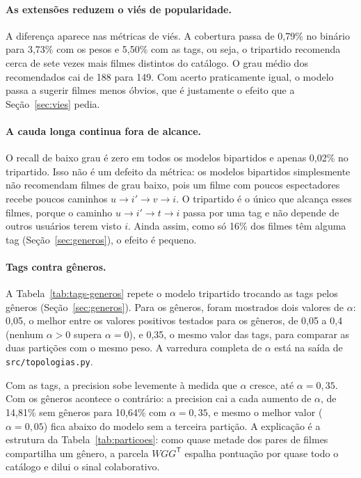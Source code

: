 \documentclass[12pt,a4paper]{article}
\theoremstyle{definition}
\begin{document}
\paragraph{As extensões reduzem o viés de popularidade.}
A diferença aparece nas métricas de viés. A cobertura passa de 0{,}79\%
no binário para 3{,}73\% com os pesos e 5{,}50\% com as tags, ou seja, o
tripartido recomenda cerca de sete vezes mais filmes distintos do
catálogo. O grau médio dos recomendados cai de 188 para 149. Com acerto
praticamente igual, o modelo passa a sugerir filmes menos óbvios, que é
justamente o efeito que a Seção~\ref{sec:vies} pedia.

\paragraph{A cauda longa continua fora de alcance.}
O recall de baixo grau é zero em todos os modelos bipartidos e apenas
0{,}02\% no tripartido. Isso não é um defeito da métrica: os modelos
bipartidos simplesmente não recomendam filmes de grau baixo, pois um
filme com poucos espectadores recebe poucos caminhos
$u \to i' \to v \to i$. O tripartido é o único que alcança esses filmes,
porque o caminho $u \to i' \to t \to i$ passa por uma tag e não depende
de outros usuários terem visto $i$. Ainda assim, como só 16\% dos filmes
têm alguma tag (Seção~\ref{sec:generos}), o efeito é pequeno.

\paragraph{Tags contra gêneros.}
A Tabela~\ref{tab:tags-generos} repete o modelo tripartido trocando as
tags pelos gêneros (Seção~\ref{sec:generos}). Para os gêneros, foram mostrados
dois valores de $\alpha$: 0{,}05, o melhor entre os valores positivos testados para os gêneros, de 0{,}05 a 0{,}4 (nenhum $\alpha > 0$
supera $\alpha = 0$), e 0{,}35, o mesmo valor das tags, para
comparar as duas partições com o mesmo peso. A varredura completa de
$\alpha$ está na saída de \texttt{src/topologias.py}.

Com as tags, a precision sobe levemente à medida que $\alpha$ cresce, até
$\alpha = 0{,}35$. Com os gêneros acontece o contrário: a precision cai a
cada aumento de $\alpha$, de 14{,}81\% sem gêneros para 10{,}64\% com
$\alpha = 0{,}35$, e mesmo o melhor valor ($\alpha = 0{,}05$) fica abaixo
do modelo sem a terceira partição. A explicação é a estrutura da
Tabela~\ref{tab:particoes}: como quase metade dos pares de filmes
compartilha um gênero, a parcela $WGG^{\mathsf T}$ espalha pontuação por
quase todo o catálogo e dilui o sinal colaborativo.
\end{document}
